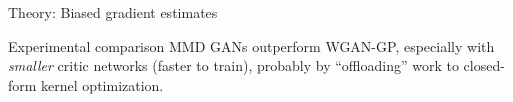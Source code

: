 \documentclass[xcolor={table}]{beamer}
\begin{document}
\begin{frame}{}
\begin{columns}[T, totalwidth=\textwidth]
\begin{column}{.32\textwidth}
\begin{block}{Theory: Biased gradient estimates}
    \end{block}
    \vspace*{-1.5ex}
    \begin{block}{Experimental comparison}
      MMD GANs outperform WGAN-GP, especially with \emph{smaller} critic networks (faster to train),
      probably by ``offloading'' work to closed-form kernel optimization.
    \end{block}
    \vspace*{-1.3cm}


\end{column}
\end{columns}
\end{frame}
\end{document}
